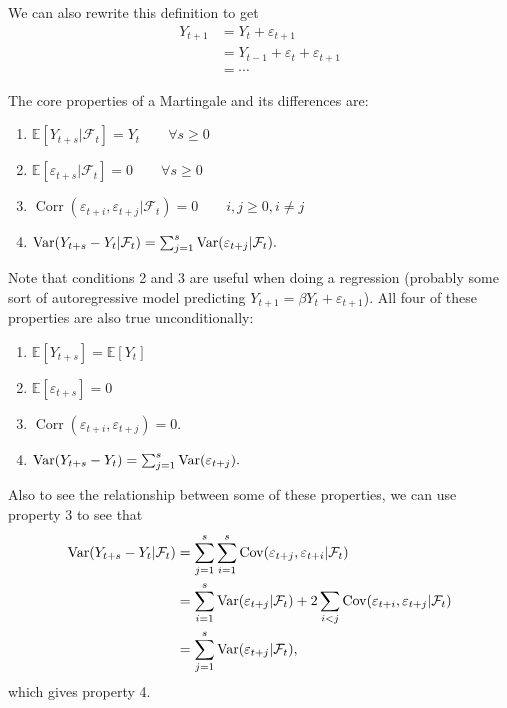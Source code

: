 
We can also rewrite this definition to get \begin{align*}
	Y_{t+1} &= Y_t + \varepsilon_{t+1} \\ 
			&= Y_{t-1} + \varepsilon_t + \varepsilon_{t+1} \\
			&= \cdots
\end{align*} 

The core properties of a Martingale and its differences are: \begin{enumerate}
	\item $\mathbb E[Y_{t+s}|\mathcal F_t] = Y_t\qquad\forall s\geq 0$
	\item $\mathbb E[\varepsilon_{t+s}|\mathcal F_t] = 0\qquad\forall s\geq 0$
	\item $\operatorname{Corr}(\varepsilon_{t+i},\varepsilon_{t+j}|\mathcal F_t)=0\qquad i,j\geq 0, i\neq j$
	\item $\operatorname{Var}(Y_{t+s}-Y_t|\mathcal F_t) = \sum_{j=1}^{s} \operatorname{Var}(\varepsilon_{t+j}|\mathcal F_t). $
\end{enumerate} Note that conditions 2 and 3 are useful when doing a regression (probably some sort of autoregressive model predicting $Y_{t+1}=\beta Y_t+\varepsilon_{t+1}$). All four of these properties are also true unconditionally: \begin{enumerate}
	\item $\mathbb E[Y_{t+s}] = \mathbb E[Y_t]$
	\item $\mathbb E[\varepsilon_{t+s}] = 0$
	\item $\operatorname{Corr}(\varepsilon_{t+i},\varepsilon_{t+j}) = 0$.
	\item $\operatorname{Var}(Y_{t+s}-Y_t) = \sum_{j=1}^{s} \operatorname{Var}(\varepsilon_{t+j}). $
\end{enumerate} 
Also to see the relationship between some of these properties, we can use property 3 to see that \begin{align*}
	\operatorname{Var}(Y_{t+s}-Y_t|\mathcal F_t) &= \sum_{j=1}^{s} \sum_{i=1}^{s} \operatorname{Cov}(\varepsilon_{t+j},\varepsilon_{t+i}|\mathcal F_t)   \\
								   &= \sum_{i=1}^{s} \operatorname{Var}(\varepsilon_{t+j}|\mathcal F_t) + 2 \sum_{i < j}^{} \operatorname{Cov}(\varepsilon_{t+i},\varepsilon_{t+j}|\mathcal F_t) \\
								   &= \sum_{j=1}^{s} \operatorname{Var}(\varepsilon_{t+j}|\mathcal F_t), 
\end{align*} which gives property 4.

